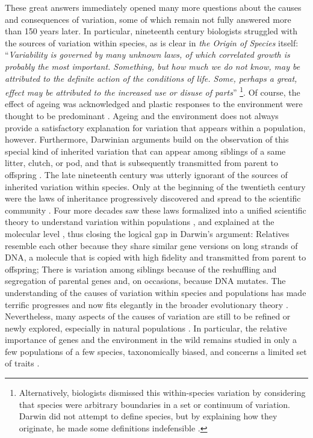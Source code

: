 These great answers immediately opened many more questions about the causes and consequences of variation, some of which remain not fully answered more than 150 years later. In particular, nineteenth century biologists struggled with the sources of variation within species, as is clear in \emph{the Origin of Species} itself:  ``\emph{Variability is governed by many unknown laws, of which correlated growth is probably the most important. Something, but how much we do not know, may be attributed to the definite action of the conditions of life. Some, perhaps a great, effect may be attributed to the increased use or disuse of parts}'' \parencite[p. 31][]{Darwin1859} \footnote{Alternatively, biologists dismissed this within-species variation by considering that species were arbitrary boundaries in a set or continuum of variation. Darwin did not attempt to define species, but by explaining how they originate, he made some definitions indefensible \parencite[][pp. 129-163]{Wilkins2009}.}. Of course, the effect of ageing was acknowledged and plastic responses to the environment were thought to be predominant \parencite{Wilkins2009}. Ageing and the environment does not always provide a satisfactory explanation for variation that appears within a population, however.
Furthermore, Darwinian arguments build on the observation of this special kind of inherited variation that can appear among siblings of a same litter, clutch, or pod, and that is subsequently transmitted from parent to offspring \parencite[][Chapter 1]{Darwin1859}. The late nineteenth century was utterly ignorant of the sources of inherited variation within species. Only at the beginning of the twentieth century were the laws of inheritance progressively discovered and spread to the scientific community \parencite{Dietrich2006}. Four more decades saw these laws formalized into a unified scientific theory to understand variation within populations \parencite{Fisher1930}, and explained at the molecular level \parencite{Oswald1943, Watson1953}, thus closing the logical gap in Darwin's argument: Relatives resemble each other because they share similar gene versions on long strands of DNA, a molecule that is copied with high fidelity and transmitted from parent to offspring; There is variation among siblings because of the reshuffling and segregation of parental genes and, on occasions, because DNA mutates. 
The understanding of the causes of variation within species and populations has made terrific progresses and now fits elegantly in the broader evolutionary theory \parencite{Pigliucci2010}. Nevertheless, many aspects of the causes of variation are still to be refined or newly explored, especially in natural populations \parencite{Kruuk2014}. In particular, the relative importance of genes and the environment in the wild remains studied in only a few populations of a few species, taxonomically biased, and concerns a limited set of traits \parencite{Lynch1998, Postma2014}. 

